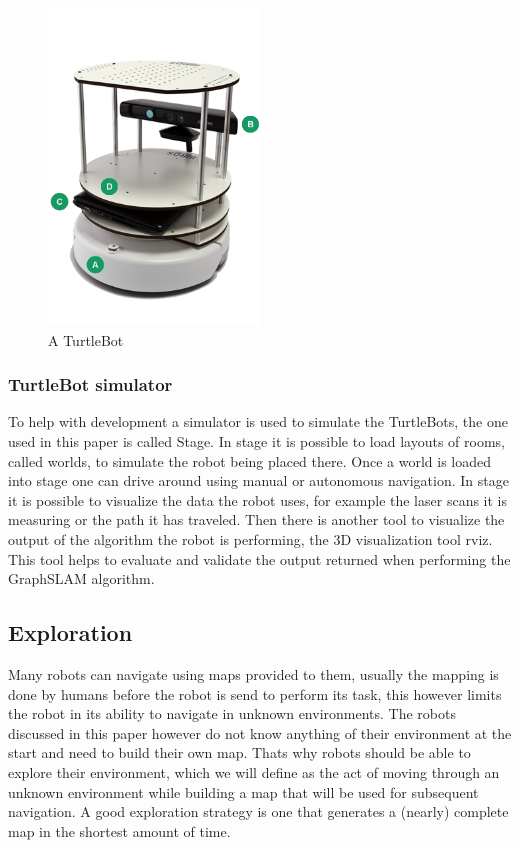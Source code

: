 \documentclass{ba-kecs}
\begin{document}
\begin{figure}[h]
	\centering
		\includegraphics[width=0.50\textwidth]{figures/turtlebot.png}
	\caption{A TurtleBot}
	\label{fig:turtlebot}
\end{figure}

\subsubsection{TurtleBot simulator}
To help with development a simulator is used to simulate the TurtleBots, the one used in this paper is called Stage. In stage it is possible to load layouts of rooms, called worlds, to simulate the robot being placed there. Once a world is loaded into stage one can drive around using manual or autonomous navigation. In stage it is possible to visualize the data the robot uses, for example the laser scans it is measuring or the path it has traveled. Then there is another tool to visualize the output of the algorithm the robot is performing, the 3D visualization tool rviz. This tool helps to evaluate and validate the output returned when performing the GraphSLAM algorithm.

\subsection{Exploration}
Many robots can navigate using maps provided to them, usually the mapping is done by humans before the robot is send to perform its task, this however limits the robot in its ability to navigate in unknown environments. The robots discussed in this paper however do not know anything of their environment at the start and need to build their own map. Thats why robots should be able to explore their environment, which we will define as the act of moving through an unknown environment while building a map that will be used for subsequent navigation. A good exploration strategy is one that generates a (nearly) complete map in the shortest amount of time.
\end{document}
